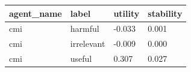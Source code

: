\begin{tabular}{llll}
\toprule
agent\_name & label & utility & stability \\
\midrule
cmi & harmful & -0.033 & 0.001 \\
cmi & irrelevant & -0.009 & 0.000 \\
cmi & useful & 0.307 & 0.027 \\
\bottomrule
\end{tabular}
